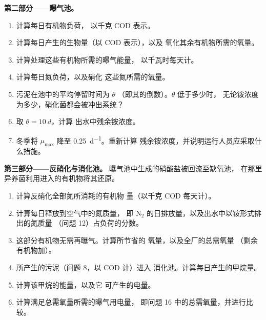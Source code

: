 \begin{problem}
\medskip
\noindent\textbf{第二部分——曝气池。}
\begin{enumerate}[resume]
  \item 计算每日有机物负荷，
        以千克 COD 表示。
  \item 计算每日产生的生物量（以 COD 表示），以及
        氧化其余有机物所需的氧量。
  \item 计算处理这些有机物所需的曝气能量，
        以千瓦时每天计。
  \item 计算每日氮负荷，以及硝化
        这些氮所需的氧量。
  \item 污泥在池中的平均停留时间为 $\theta$
        （即其的倒数）。$\theta$ 低于多少时，
        无论铵浓度为多少，硝化菌都会被冲出系统？
  \item 取 $\theta = \qty{10}{d}$，计算
        出水中残余铵浓度。
  \item 冬季将 $\mu_{\max}$ 降至 \qty{0.25}{d^{-1}}。重新计算
        残余铵浓度，并说明运行人员应采取什么措施。
\end{enumerate}

\medskip
\noindent\textbf{第三部分——反硝化与消化池。}
曝气池中生成的硝酸盐被回流至缺氧池，
在那里异养菌利用进入的有机物将其还原。
\begin{enumerate}[resume]
  \item 计算反硝化全部氮所消耗的有机物
        量（以千克 COD 每天计）。
  \item 计算每日释放到空气中的氮质量，
        即 $\mathrm{N_2}$ 的日排放量，以及出水中以铵形式排出的氮质量
        （问题 12）占负荷的分数。
  \item 这部分有机物无需再曝气。计算所节省的
        氧量，以及全厂的总需氧量
        （剩余有机物加）。
  \item 所产生的污泥（问题 8，以 COD 计）进入
        消化池。计算每日产生的甲烷量。
  \item 计算该甲烷的能量，以及它
        可产生的电量。
  \item 计算满足总需氧量所需的曝气用电量，
        即问题 16 中的总需氧量，并进行比较。
\end{enumerate}


\end{problem}
